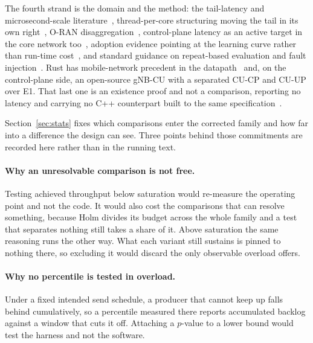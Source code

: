 \documentclass[english,oneside,a4paper,censored,csm,software-track-2020]{HYthesisML}
\begin{document}
\begin{appendices}
The fourth strand is the domain and the method: the tail-latency and microsecond-scale
literature~\cite{dean2013tail,barroso2017microseconds,li2014tales,huang2017predictability},
thread-per-core structuring moving the tail in its own right~\cite{enberg2019threadpercore},
O-RAN disaggregation~\cite{polese2023oran}, control-plane latency as an active target in the
core network too~\cite{liu2023l25gc,park2025ctrlbench}, adoption evidence pointing at the
learning curve rather than run-time
cost~\cite{fulton2021adopting,crichton2024learning,ardito2021verbosity}, and standard guidance on
repeat-based evaluation and fault injection~\cite{georges2007rigorous,natella2016fault}. Rust
has mobile-network precedent in the datapath~\cite{qazi2017pepc} and, on the control-plane
side, an open-source gNB-CU with a separated CU-CP and CU-UP over E1. That last one is an
existence proof and not a comparison, reporting no latency and carrying no C++ counterpart built
to the same specification~\cite{alsoran}.

Section~\ref{sec:stats} fixes which comparisons enter the corrected family and how far into a
difference the design can see. Three points behind those commitments are recorded here rather
than in the running text.

\paragraph{Why an unresolvable comparison is not free.}
Testing achieved throughput below saturation would re-measure the operating point and not the
code. It would also cost the comparisons that can resolve something, because Holm divides its
budget across the whole family and a test that separates nothing still takes a share of it. Above
saturation the same reasoning runs the other way. What each variant still sustains is pinned to
nothing there, so excluding it would discard the only observable overload offers.

\paragraph{Why no percentile is tested in overload.}
Under a fixed intended send schedule, a producer that cannot keep up falls behind cumulatively, so
a percentile measured there reports accumulated backlog against a window that cuts it off.
Attaching a $p$-value to a lower bound would test the harness and not the software.


\end{appendices}
\end{document}
